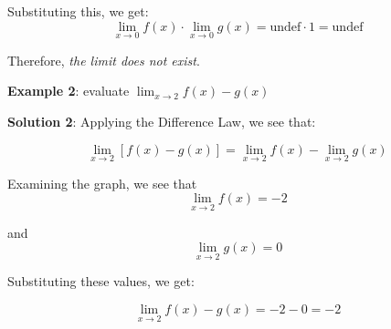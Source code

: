 Substituting this, we get: 
$$\lim_{x\to0}f(x) \cdot \lim_{x\to0} g(x) = \text{undef} \cdot 1 = \text{undef}$$

Therefore, \textit{the limit does not exist}. 

\textbf{Example 2}: evaluate $\lim_{x\to2}f(x) - g(x)$

\textbf{Solution 2}: Applying the Difference Law, we see that:

$$\lim_{x\to2}[f(x) - g(x)] = \lim_{x\to2}f(x) - \lim_{x\to2}g(x)$$

Examining the graph, we see that 
$$\lim_{x\to2}f(x) = -2$$ 

and 
$$\lim_{x\to2}g(x) = 0$$

Substituting these values, we get:

$$\lim_{x\to2}f(x) - g(x) = -2 - 0 = -2$$

